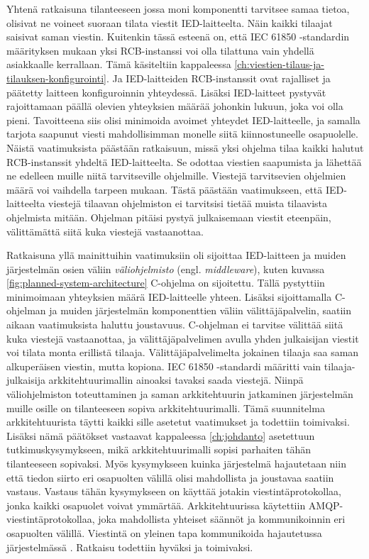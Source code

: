 Yhtenä ratkaisuna tilanteeseen jossa moni komponentti tarvitsee samaa tietoa, olisivat ne voineet suoraan tilata viestit IED-laitteelta. Näin kaikki tilaajat saisivat saman viestin. Kuitenkin tässä esteenä on, että IEC 61850 -standardin määrityksen mukaan yksi RCB-instanssi voi olla tilattuna vain yhdellä asiakkaalle kerrallaan. Tämä käsiteltiin kappaleessa \ref{ch:viestien-tilaus-ja-tilauksen-konfigurointi}. Ja IED-laitteiden RCB-instanssit ovat rajalliset ja päätetty laitteen konfiguroinnin yhteydessä. Lisäksi IED-laitteet pystyvät rajoittamaan päällä olevien yhteyksien määrää johonkin lukuun, joka voi olla pieni. Tavoitteena siis olisi minimoida avoimet yhteydet IED-laitteelle, ja samalla tarjota saapunut viesti mahdollisimman monelle siitä kiinnostuneelle osapuolelle. Näistä vaatimuksista päästään ratkaisuun, missä yksi ohjelma tilaa kaikki halutut RCB-instanssit yhdeltä IED-laitteelta. Se odottaa viestien saapumista ja lähettää ne edelleen muille niitä tarvitseville ohjelmille. Viestejä tarvitsevien ohjelmien määrä voi vaihdella tarpeen mukaan. Tästä päästään vaatimukseen, että IED-laitteelta viestejä tilaavan ohjelmiston ei tarvitsisi tietää muista tilaavista ohjelmista mitään. Ohjelman pitäisi pystyä julkaisemaan viestit eteenpäin, välittämättä siitä kuka viestejä vastaanottaa.

Ratkaisuna yllä mainittuihin vaatimuksiin oli sijoittaa IED-laitteen ja muiden järjestelmän osien väliin \emph{väliohjelmisto} (engl. \emph{middleware}), kuten kuvassa \ref{fig:planned-system-architecture} C-ohjelma on sijoitettu. Tällä pystyttiin minimoimaan yhteyksien määrä IED-laitteelle yhteen. Lisäksi sijoittamalla C-ohjelman ja muiden järjestelmän komponenttien väliin välittäjäpalvelin, saatiin aikaan vaatimuksista haluttu joustavuus. C-ohjelman ei tarvitse välittää siitä kuka viestejä vastaanottaa, ja välittäjäpalvelimen avulla yhden julkaisijan viestit voi tilata monta erillistä tilaaja. Välittäjäpalvelimelta jokainen tilaaja saa saman alkuperäisen viestin, mutta kopiona. IEC 61850 -standardi määritti vain tilaaja-julkaisija arkkitehtuurimallin ainoaksi tavaksi saada viestejä. Niinpä väliohjelmiston toteuttaminen ja saman arkkitehtuurin jatkaminen järjestelmän muille osille on tilanteeseen sopiva arkkitehtuurimalli. Tämä suunnitelma arkkitehtuurista täytti kaikki sille asetetut vaatimukset ja todettiin toimivaksi. Lisäksi nämä päätökset vastaavat kappaleessa \ref{ch:johdanto} asetettuun tutkimuskysymykseen, mikä arkkitehtuurimalli sopisi parhaiten tähän tilanteeseen sopivaksi. Myös kysymykseen kuinka järjestelmä hajautetaan niin että tiedon siirto eri osapuolten välillä olisi mahdollista ja joustavaa saatiin vastaus. Vastaus tähän kysymykseen on käyttää jotakin viestintäprotokollaa, jonka kaikki osapuolet voivat ymmärtää. Arkkitehtuurissa käytettiin AMQP-viestintäprotokollaa, joka mahdollista yhteiset säännöt ja kommunikoinnin eri osapuolten välillä. Viestintä on yleinen tapa kommunikoida hajautetussa järjestelmässä \mbox{\cite[s.~2]{distributed-systems-concepts-and-design}}. Ratkaisu todettiin hyväksi ja toimivaksi.

